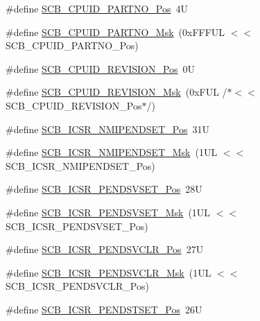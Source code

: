 \begin{DoxyCompactItemize}
\#define \hyperlink{group___c_m_s_i_s___s_c_b_ga705f68eaa9afb042ca2407dc4e4629ac}{S\-C\-B\-\_\-\-C\-P\-U\-I\-D\-\_\-\-P\-A\-R\-T\-N\-O\-\_\-\-Pos}~4\-U
\item 
\#define \hyperlink{group___c_m_s_i_s___s_c_b_ga98e581423ca016680c238c469aba546d}{S\-C\-B\-\_\-\-C\-P\-U\-I\-D\-\_\-\-P\-A\-R\-T\-N\-O\-\_\-\-Msk}~(0x\-F\-F\-F\-U\-L $<$$<$ S\-C\-B\-\_\-\-C\-P\-U\-I\-D\-\_\-\-P\-A\-R\-T\-N\-O\-\_\-\-Pos)
\item 
\#define \hyperlink{group___c_m_s_i_s___s_c_b_ga3c3d9071e574de11fb27ba57034838b1}{S\-C\-B\-\_\-\-C\-P\-U\-I\-D\-\_\-\-R\-E\-V\-I\-S\-I\-O\-N\-\_\-\-Pos}~0\-U
\item 
\#define \hyperlink{group___c_m_s_i_s___s_c_b_ga2ec0448b6483f77e7f5d08b4b81d85df}{S\-C\-B\-\_\-\-C\-P\-U\-I\-D\-\_\-\-R\-E\-V\-I\-S\-I\-O\-N\-\_\-\-Msk}~(0x\-F\-U\-L /$\ast$$<$$<$ S\-C\-B\-\_\-\-C\-P\-U\-I\-D\-\_\-\-R\-E\-V\-I\-S\-I\-O\-N\-\_\-\-Pos$\ast$/)
\item 
\#define \hyperlink{group___c_m_s_i_s___s_c_b_ga750d4b52624a46d71356db4ea769573b}{S\-C\-B\-\_\-\-I\-C\-S\-R\-\_\-\-N\-M\-I\-P\-E\-N\-D\-S\-E\-T\-\_\-\-Pos}~31\-U
\item 
\#define \hyperlink{group___c_m_s_i_s___s_c_b_ga340e3f79e9c3607dee9f2c048b6b22e8}{S\-C\-B\-\_\-\-I\-C\-S\-R\-\_\-\-N\-M\-I\-P\-E\-N\-D\-S\-E\-T\-\_\-\-Msk}~(1\-U\-L $<$$<$ S\-C\-B\-\_\-\-I\-C\-S\-R\-\_\-\-N\-M\-I\-P\-E\-N\-D\-S\-E\-T\-\_\-\-Pos)
\item 
\#define \hyperlink{group___c_m_s_i_s___s_c_b_gab5ded23d2ab1d5ff7cc7ce746205e9fe}{S\-C\-B\-\_\-\-I\-C\-S\-R\-\_\-\-P\-E\-N\-D\-S\-V\-S\-E\-T\-\_\-\-Pos}~28\-U
\item 
\#define \hyperlink{group___c_m_s_i_s___s_c_b_ga1e40d93efb402763c8c00ddcc56724ff}{S\-C\-B\-\_\-\-I\-C\-S\-R\-\_\-\-P\-E\-N\-D\-S\-V\-S\-E\-T\-\_\-\-Msk}~(1\-U\-L $<$$<$ S\-C\-B\-\_\-\-I\-C\-S\-R\-\_\-\-P\-E\-N\-D\-S\-V\-S\-E\-T\-\_\-\-Pos)
\item 
\#define \hyperlink{group___c_m_s_i_s___s_c_b_gae218d9022288f89faf57187c4d542ecd}{S\-C\-B\-\_\-\-I\-C\-S\-R\-\_\-\-P\-E\-N\-D\-S\-V\-C\-L\-R\-\_\-\-Pos}~27\-U
\item 
\#define \hyperlink{group___c_m_s_i_s___s_c_b_ga4a901ace381d3c1c74ac82b22fae2e1e}{S\-C\-B\-\_\-\-I\-C\-S\-R\-\_\-\-P\-E\-N\-D\-S\-V\-C\-L\-R\-\_\-\-Msk}~(1\-U\-L $<$$<$ S\-C\-B\-\_\-\-I\-C\-S\-R\-\_\-\-P\-E\-N\-D\-S\-V\-C\-L\-R\-\_\-\-Pos)
\item 
\#define \hyperlink{group___c_m_s_i_s___s_c_b_ga9dbb3358c6167c9c3f85661b90fb2794}{S\-C\-B\-\_\-\-I\-C\-S\-R\-\_\-\-P\-E\-N\-D\-S\-T\-S\-E\-T\-\_\-\-Pos}~26\-U

\end{DoxyCompactItemize}
